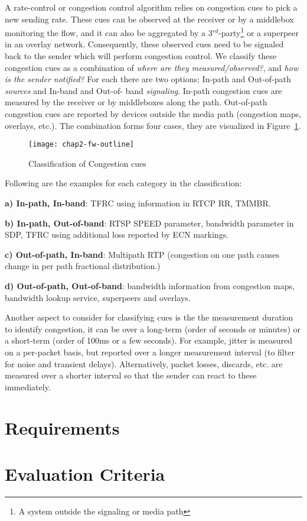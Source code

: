 A rate-control or congestion control algorithm relies on congestion cues to
pick a new sending rate. These cues can be observed at the receiver or by a
middlebox monitoring the flow, and it can also be aggregated by a
3$^{rd}$-party\footnote{A system outside the signaling or media path} or a
superpeer in an overlay network. Consequently, these observed cues need to be
signaled back to the sender which will perform congestion control. We classify
these congestion cues as a combination of \emph{where are they
measured/observed?}, and \emph{how is the sender notified?} For each there are
two options; In-path and Out-of-path \emph{sources} and In-band and Out-of-%
band \emph{signaling}. In-path congestion cues are measured by the receiver or
by middleboxes along the path. Out-of-path congestion cues are reported by
devices outside the media path (congestion maps, overlays, etc.). The
combination forms four cases, they are visualized in Figure~\ref{fig:4:fw}.


\begin{figure}[!h]
\texttt{[image: chap2-fw-outline]}
\caption{Classification of Congestion cues}
\label{fig:4:fw}
\end{figure}

Following are the examples for each category in the classification:

\textbf{a) In-path, In-band}: TFRC using information in RTCP RR, TMMBR.

\textbf{b) In-path, Out-of-band}: RTSP SPEED parameter, bandwidth parameter in
SDP, TFRC using additional loss reported by ECN markings.

\textbf{c) Out-of-path, In-band}: Multipath RTP (congestion on one path causes
change in per path fractional distribution.)

\textbf{d) Out-of-path, Out-of-band}: bandwidth information from congestion
maps, bandwidth lookup service, superpeers and overlays.


Another aspect to consider for classifying cues is the the measurement
duration to identify congestion, it can be over a long-term (order of seconds
or minutes) or a short-term (order of 100ms or a few seconds). For example,
jitter is measured on a per-packet basis, but reported over a longer
measurement interval (to filter for noise and transient delays).
Alternatively, packet losses, discards, etc. are measured over a shorter
interval so that the sender can react to these immediately.

\section{Requirements}
\label{fw.cc.req}

\section{Evaluation Criteria}
\label{fw.cc.eval}

